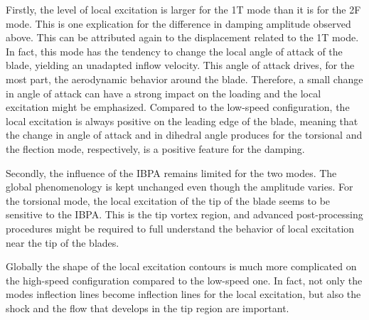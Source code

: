Firstly, the level of local excitation is larger for the
1T mode than it is for the 2F mode. This is one explication
for the difference in damping amplitude observed above.
This can be attributed again to the displacement related to the
1T mode. In fact, this mode has the tendency to change the
local angle of attack of the blade, yielding an unadapted
inflow velocity. This angle of attack drives, for the most part,
the aerodynamic behavior around the blade. Therefore, a small
change in angle of attack can have a strong impact on the loading and
the local excitation might be emphasized.
Compared to the low-speed configuration, the local excitation
is always positive on the leading edge of the blade, meaning
that the change in angle of attack and in dihedral angle
produces for the torsional and the flection mode, respectively,
is a positive feature for the damping.

Secondly, the influence of the IBPA remains limited for the
two modes. The global phenomenology is
kept unchanged even though the amplitude varies.
For the torsional mode, the local excitation of
the tip of the blade seems to be sensitive 
to the IBPA. This is the tip vortex region, and
advanced post-processing procedures might be required
to full understand the behavior of local excitation
near the tip of the blades.

Globally the shape of the local excitation contours
is much more complicated on the high-speed configuration
compared to the low-speed one. In fact, 
not only the modes inflection lines become inflection lines
for the local excitation, but also the shock and 
the flow that develops in the tip region are important.

